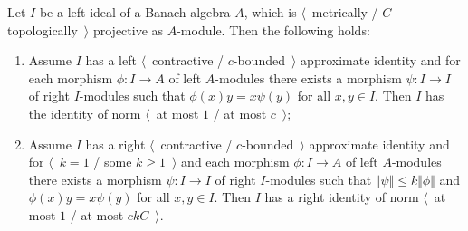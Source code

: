 \begin{lemma}\label{GoodIdealMetTopProjIsUnital} Let $I$ be a left ideal of a
Banach algebra $A$, which is $\langle$~metrically / $C$-topologically~$\rangle$
projective as $A$-module. Then the following holds:

\begin{enumerate}[label = (\roman*)]
    \item Assume $I$ has a left $\langle$~contractive / $c$-bounded~$\rangle$
    approximate identity and for each  morphism $\phi:I\to A$ of left
    $A$-modules there exists a morphism $\psi:I\to I$ of right $I$-modules such
    that $\phi(x)y=x\psi(y)$ for all $x,y\in I$. Then $I$ has the identity of
    norm $\langle$~at most $1$ / at most $c$~$\rangle$;

    \item Assume $I$ has a right $\langle$~contractive / $c$-bounded~$\rangle$
    approximate identity and for $\langle$~$k=1$ / some $k\geq 1$~$\rangle$ and
    each morphism $\phi:I\to A$ of left $A$-modules there exists a morphism
    $\psi:I\to I$ of right $I$-modules such that $\Vert\psi\Vert\leq
    k\Vert\phi\Vert$ and $\phi(x)y=x\psi(y)$ for all $x,y\in I$. Then $I$ has a
    right identity of norm $\langle$~at most $1$ / at most $ckC$~$\rangle$.
\end{enumerate}
\end{lemma} 
